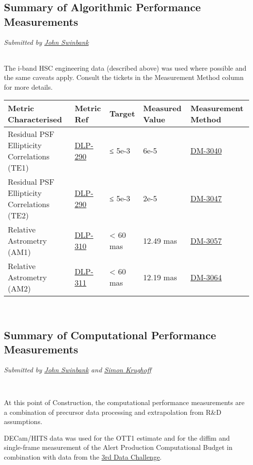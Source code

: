\subsection{Summary of Algorithmic Performance
Measurements}\label{summary-of-algorithmic-performance-measurements}

\emph{Submitted by \href{file:////display/~swinbank}{John Swinbank}}

\emph{\\
}The i-band HSC engineering data (described above) was used where
possible and the same caveats apply. Consult the tickets in the
Measurement Method column for more details.

\begin{longtable}[]{@{}lllll@{}}
\toprule
\textbf{Metric Characterised} & \textbf{Metric Ref} & \textbf{Target} &
\textbf{Measured Value} & \textbf{Measurement Method}\tabularnewline
\midrule
\endhead
Residual PSF Ellipticity Correlations (TE1) &
\href{https://jira.lsstcorp.org/browse/DLP-290}{DLP-290} & ≤ 5e-3 & 6e-5
&
\href{https://jira.lsstcorp.org/browse/DM-3040}{DM-3040}\tabularnewline
Residual PSF Ellipticity Correlations (TE2) &
\href{https://jira.lsstcorp.org/browse/DLP-290}{DLP-290} & ≤ 5e-3 & 2e-5
& \href{https://jira.lsstcorp.org/browse/DM-3047}{DM-3047
}\tabularnewline
Relative Astrometry (AM1) &
\href{https://jira.lsstcorp.org/browse/DLP-310}{DLP-310} & \textless{}
60 mas & 12.49 mas &
\href{https://jira.lsstcorp.org/browse/DM-3057}{DM-3057}\tabularnewline
Relative Astrometry (AM2) &
\href{https://jira.lsstcorp.org/browse/DLP-311}{DLP-311} & \textless{}
60 mas & 12.19 mas &
\href{https://jira.lsstcorp.org/browse/DM-3064}{DM-3064}\tabularnewline
\bottomrule
\end{longtable}

~

\subsection{Summary of Computational Performance
Measurements}\label{summary-of-computational-performance-measurements}

\emph{Submitted by \href{file:////display/~swinbank}{John Swinbank} and
\href{file:////display/~krughoff}{Simon Krughoff}}

~

At this point of Construction, the computational performance
measurements are a combination of precursor data processing and
extrapolation from R\&D assumptions.

DECam/HITS data was used for the OTT1 estimate and for the diffim and
single-frame measurement of the Alert Production Computational Budget in
combination with data from the
\href{https://dev.lsstcorp.org/trac/wiki/DC3bPT1_1}{3rd Data Challenge}.

